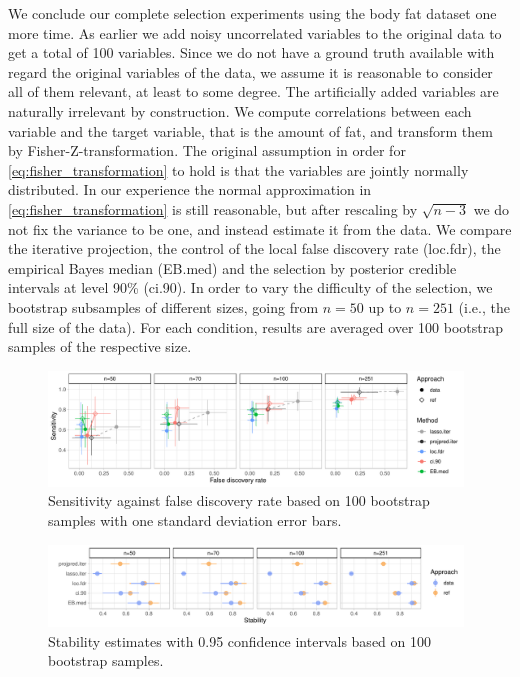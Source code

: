 \documentclass[a4]{article}
\theoremstyle{definition}
\begin{document}
We conclude our complete selection experiments using the body fat
dataset one more time. As earlier we add noisy uncorrelated variables
to the original data to get a total of 100 variables.
Since we do not have a ground truth available with regard the original
variables of the data, we assume it is reasonable to consider all of
them relevant, at least to some degree. The artificially added
variables are naturally irrelevant by construction.
We compute
correlations between each variable and the target variable, that is
the amount of fat, and transform them by Fisher-Z-transformation. The
original assumption in order for \eqref{eq:fisher_transformation} to
hold is that the variables are jointly normally distributed. In our
experience the normal approximation in
\eqref{eq:fisher_transformation} is still reasonable, but after
rescaling by $\sqrt{n-3}$ we do not fix the variance to be one, and
instead estimate it from the data. We compare the iterative projection, 
the control of the local false discovery rate (loc.fdr), 
the empirical Bayes median (EB.med)
and the selection by posterior credible intervals at level 90\%
(ci.90).  In order to vary the difficulty of the selection, we
bootstrap subsamples of different sizes, going from $n=50$ up to
$n=251$ (i.e., the full size of the data). For each condition, results
are averaged over 100 bootstrap samples of the respective size.

\begin{figure}[tp]
  \centering
  \includegraphics[width=0.98\textwidth]{graphics/bodyfat_sensitivity_vs_fdr.pdf}
  \caption{Sensitivity against false discovery rate based on 100 bootstrap samples with one standard deviation error bars.\\}
  \label{fig:bodyfat_sensitivity_vs_fdr}
\end{figure}

\begin{figure}[tp]
  \centering
  \includegraphics[width=0.98\textwidth]{graphics/bodyfat_stability.pdf}
  \caption{Stability estimates with 0.95 confidence intervals based on 100 bootstrap samples.\\}
  \label{fig:bodyfat_stability}
\end{figure}
\end{document}
